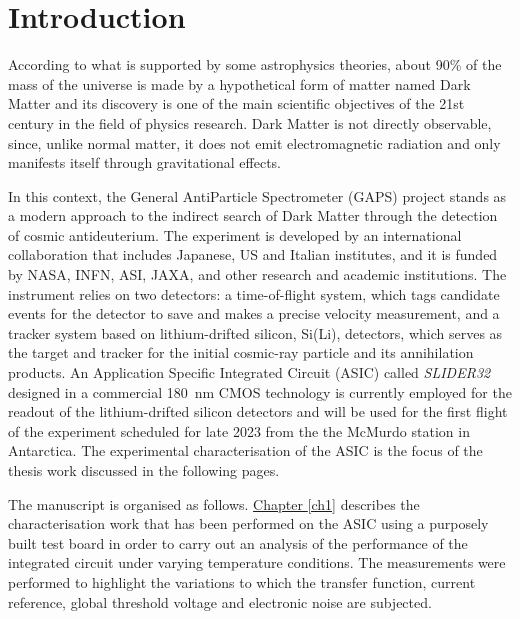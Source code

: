 \chapter*{Introduction}  %

\par
According to what is supported by some astrophysics theories, about 90\% of the mass of the universe is made by a hypothetical form of matter named Dark Matter and its discovery is one of the main scientific objectives of the 21st century in the field of physics research. Dark Matter is not directly observable, since, unlike normal matter, it does not emit electromagnetic radiation and only manifests itself through gravitational effects. 

\par
In this context, the General AntiParticle Spectrometer (GAPS) project stands as a modern approach to the indirect search of Dark Matter through the detection of cosmic antideuterium. The experiment is developed by an international collaboration that includes Japanese, US and Italian institutes, and it is funded by NASA, INFN, ASI, JAXA, and other research and academic institutions. The instrument relies on two detectors: a time-of-flight system, which tags candidate events for the detector to save and makes a precise velocity measurement, and a tracker system based on lithium-drifted silicon, Si(Li), detectors, which serves as the target and tracker for the initial cosmic-ray particle and its annihilation products. An Application Specific Integrated Circuit (ASIC) called \textit{SLIDER32} designed in a commercial \SI{180}{\nano\meter} CMOS technology is currently employed for the readout of the lithium-drifted silicon detectors and will be used for the first flight of the experiment scheduled for late 2023 from the the McMurdo station in Antarctica. The experimental characterisation of the ASIC is the focus of the thesis work discussed  in the following pages.

\par
The manuscript is organised as follows. \hyperref[ch1]{Chapter \ref{ch1}} describes the characterisation work that has been performed on the ASIC using a purposely built test board in order to carry out an analysis of the performance of the integrated circuit under varying temperature conditions. The measurements were performed to highlight the variations to which the transfer function, current reference, global threshold voltage and electronic noise are subjected.


